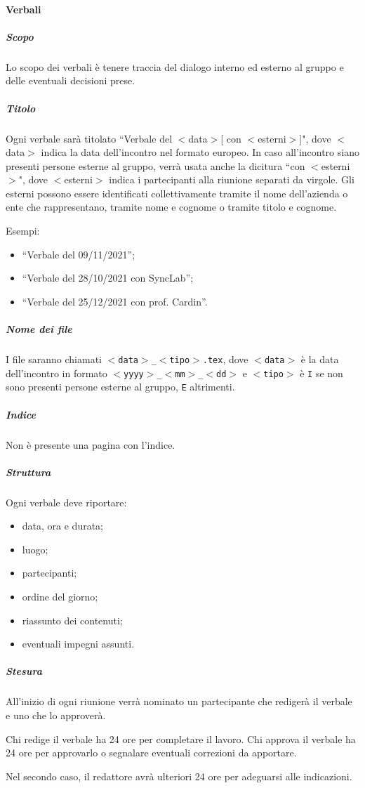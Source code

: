 \documentclass[a4paper, 12pt]{article}
\begin{document}
\paragraph{Verbali}
\subparagraph{Scopo}
Lo scopo dei verbali è tenere traccia del dialogo interno ed esterno al gruppo e delle eventuali decisioni prese.
\subparagraph{Titolo}
Ogni verbale sarà titolato ``Verbale del $<$data$>$[ con $<$esterni$>$]", dove $<$data$>$ indica la data dell'incontro nel formato europeo. In caso all'incontro siano presenti persone esterne al gruppo, verrà usata anche la dicitura ``con $<$esterni$>$", dove $<$esterni$>$ indica i partecipanti alla riunione separati da virgole. Gli esterni possono essere identificati collettivamente tramite il nome dell'azienda o ente che rappresentano, tramite nome e cognome o tramite titolo e cognome.

Esempi:
\begin{itemize}
\item ``Verbale del 09/11/2021'';
\item ``Verbale del 28/10/2021 con SyncLab'';
\item ``Verbale del 25/12/2021 con prof. Cardin''.
\end{itemize}
\subparagraph{Nome dei file}
I file saranno chiamati \texttt{$<$data$>$\_$<$tipo$>$.tex}, dove \texttt{$<$data$>$} è la data dell'incontro in formato \texttt{$<$yyyy$>$\_$<$mm$>$\_$<$dd$>$} e \texttt{$<$tipo$>$} è \texttt{I} se non sono presenti persone esterne al gruppo, \texttt{E} altrimenti.
\subparagraph{Indice}
Non è presente una pagina con l'indice.
\subparagraph{Struttura}
Ogni verbale deve riportare:
\begin{itemize}
\item data, ora e durata;
\item luogo;
\item partecipanti;
\item ordine del giorno;
\item riassunto dei contenuti;
\item eventuali impegni assunti.
\end{itemize}
\subparagraph{Stesura}\label{documentazione-documenti-verbali-stesura}
All'inizio di ogni riunione verrà nominato un partecipante che redigerà il verbale e uno che lo approverà.

Chi redige il verbale ha 24 ore per completare il lavoro. Chi approva il verbale ha 24 ore per approvarlo o segnalare eventuali correzioni da apportare.

Nel secondo caso, il redattore avrà ulteriori 24 ore per adeguarsi alle indicazioni.
\end{document}
